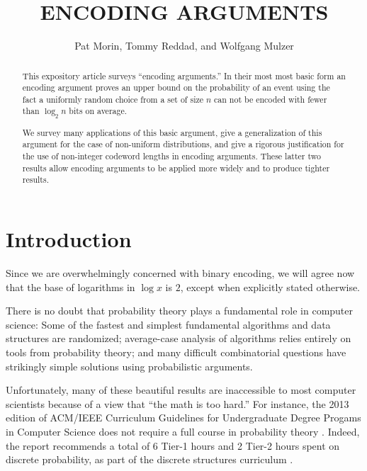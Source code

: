 \documentclass{patmorin}
\title{\MakeUppercase{Encoding Arguments}}
\author{Pat Morin, Tommy Reddad, and Wolfgang Mulzer}
\date{}
\begin{document}
\begin{titlepage}
\maketitle


\begin{abstract}
  \setlength{\baselineskip}{15.84pt}

  This expository article surveys ``encoding arguments.'' In their
  most most basic form an encoding argument proves an upper bound on
  the probability of an event using the fact a uniformly random choice
  from a set of size $n$ can not be encoded with fewer than $\log_2 n$
  bits on average.

  We survey many applications of this basic argument, give a
  generalization of this argument for the case of non-uniform
  distributions, and give a rigorous justification for the use of
  non-integer codeword lengths in encoding arguments.  These latter
  two results allow encoding arguments to be applied more widely and
  to produce tighter results.
\end{abstract}


\end{titlepage}
\tableofcontents
\newpage
{}

\section{Introduction}
\setlength{\baselineskip}{15.84pt}

Since we are overwhelmingly concerned with binary encoding, we will
agree now that the base of logarithms in $\log x$ is $2$, except when
explicitly stated otherwise.

There is no doubt that probability theory plays a fundamental role in
computer science: Some of the fastest and simplest fundamental
algorithms and data structures are randomized; average-case analysis
of algorithms relies entirely on tools from probability theory; and
many difficult combinatorial questions have strikingly simple
solutions using probabilistic arguments.

Unfortunately, many of these beautiful results are inaccessible to
most computer scientists because of a view that ``the math is too
hard.''  For instance, the 2013 edition of ACM/IEEE Curriculum
Guidelines for Undergraduate Degree Progams in Computer Science does
not require a full course in probability theory
\cite[Page~50]{computing-curricula:computer}. Indeed, the report
recommends a total of 6 Tier-1 hours and 2 Tier-2 hours spent on
discrete probability, as part of the discrete structures curriculum
\cite[Page~77]{computing-curricula:computer}.
\end{document}
